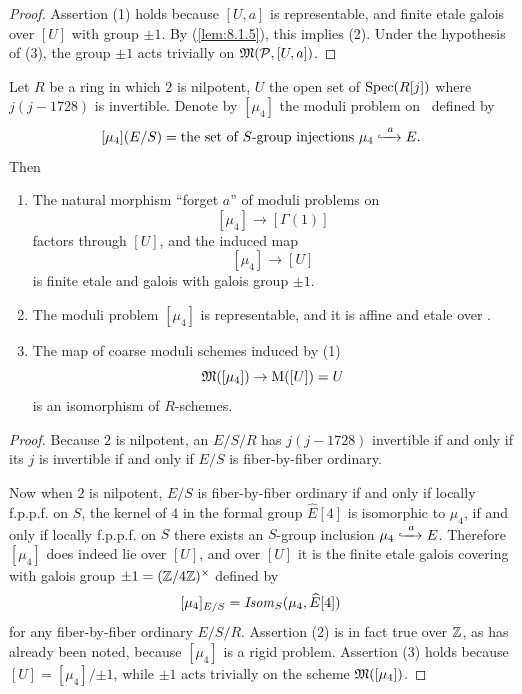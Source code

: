 \begin{proof}
Assertion (1) holds because $[U, a]$ is representable, and finite etale galois over $[U]$ with group $\pm 1$. By (\ref{lem:8.1.5}), this implies (2). Under the hypothesis of (3), the group $\pm 1$ acts trivially on $\mathfrak{M}(\mathcal{P}, [U, a])$.
\end{proof}

\begin{kthm}\label{thm:8.4.11}
Let $R$ be a ring in which $2$ is nilpotent, $U$ the open set of $\operatorname{Spec}(R[j])$ where $j(j-1728)$ is invertible. Denote by $[\mu_4]$ the moduli problem on \EllR\ defined by
\[
[\mu_4](E/S) = \text{the set of $S$-group injections } \mu_4 \xhookrightarrow{\ a\ } E .
\]
Then
\begin{enumerate}[(1)]
\item The natural morphism ``forget $a$'' of moduli problems on \EllR
\[
[\mu_4] \to [\Gamma(1)]
\]
factors through $[U]$, and the induced map
\[
[\mu_4] \to [U]
\]
is finite etale and galois with galois group $\pm 1$.
\item The moduli problem $[\mu_4]$ is representable, and it is affine and etale over \EllR.
\item The map of coarse moduli schemes induced by (1)
\[
\mathfrak{M}([\mu_4]) \to \mathrm{M}([U]) = U
\]
is an isomorphism of $R$-schemes.
\end{enumerate}
\end{kthm}

\begin{proof}
Because $2$ is nilpotent, an $E/S/R$ has $j(j-1728)$ invertible if and only if its $j$ is invertible if and only if $E/S$ is fiber-by-fiber ordinary.

Now when $2$ is nilpotent, $E/S$ is fiber-by-fiber ordinary if and only if locally f.p.p.f. on $S$, the kernel of $4$ in the formal group $\widehat{E}[4]$ is isomorphic to $\mu_4$, if and only if locally f.p.p.f. on $S$ there exists an $S$-group inclusion $\mu_4 \xhookrightarrow{\ a\ } E$. Therefore $[\mu_4]$ does indeed lie over $[U]$, and over $[U]$ it is the finite etale galois covering with galois group $\pm 1 = (\mathbb{Z}/4\mathbb{Z})^\times$ defined by
\[
[\mu_4]_{E/S} = \mathit{Isom}_S(\mu_4, \widehat{E}[4])
\]
for any fiber-by-fiber ordinary $E/S/R$. Assertion (2) is in fact true over $\mathbb{Z}$, as has already been noted, because $[\mu_4]$ is a rigid problem. Assertion (3) holds because $[U] = [\mu_4]/{\pm 1}$, while $\pm 1$ acts trivially on the scheme $\mathfrak{M}([\mu_4])$.
\end{proof}

